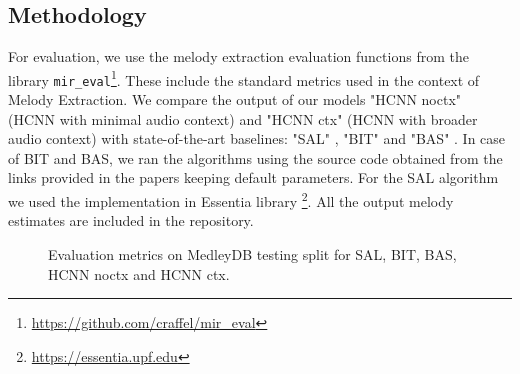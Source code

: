 \documentclass{article}
\begin{document}
\subsection{Methodology}

For evaluation, we use the melody extraction evaluation functions from the library \texttt{mir\_eval}\footnote{\url{https://github.com/craffel/mir_eval}}. These include the standard metrics used in the context of Melody Extraction. We compare the output of our models "HCNN noctx" (HCNN with minimal audio context) and "HCNN ctx" (HCNN with broader audio context) with state-of-the-art baselines: "SAL" \cite{Salamon2012a}, "BIT" \cite{Bittner2017} and "BAS" \cite{DBasaranSEssid2018}. In case of BIT and BAS, we ran the algorithms using the source code obtained from the links provided in the papers keeping default parameters. For the SAL algorithm we used the implementation in Essentia library \footnote{\url{https://essentia.upf.edu}}. All the output melody estimates are included in the repository.


\begin{figure}
 \centerline{}
 \caption{Evaluation metrics on MedleyDB testing split for SAL, BIT, BAS, HCNN noctx and HCNN ctx.}
 \label{fig:medleydb_scores_sota}
\end{figure}
\end{document}
